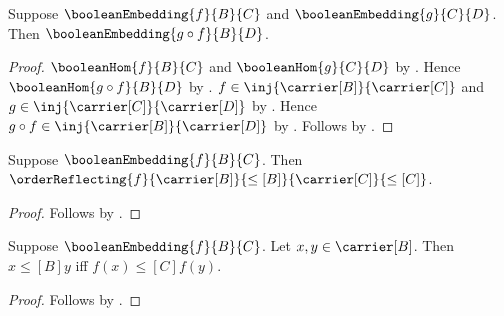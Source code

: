\begin{theorem}\label{boolean_embedding_composition}
    Suppose $\booleanEmbedding{f}{B}{C}$ and
        $\booleanEmbedding{g}{C}{D}$.
    Then $\booleanEmbedding{g\circ f}{B}{D}$.
\end{theorem}
\begin{proof}
    $\booleanHom{f}{B}{C}$ and $\booleanHom{g}{C}{D}$ by
        .
    Hence $\booleanHom{g\circ f}{B}{D}$ by
        .
    $f\in\inj{\carrier[B]}{\carrier[C]}$ and
        $g\in\inj{\carrier[C]}{\carrier[D]}$ by
        .
    Hence $g\circ f\in\inj{\carrier[B]}{\carrier[D]}$ by
        .
    Follows by .
\end{proof}

\begin{theorem}\label{boolean_embedding_order_reflecting}
    Suppose $\booleanEmbedding{f}{B}{C}$.
    Then
        $\orderReflecting
            {f}{\carrier[B]}{\leq[B]}
            {\carrier[C]}{\leq[C]}$.
\end{theorem}
\begin{proof}
    Follows by
        .
\end{proof}

\begin{proposition}\label{boolean_embedding_order_iff}
    Suppose $\booleanEmbedding{f}{B}{C}$.
    Let $x,y\in\carrier[B]$.
    Then $x\mathrel{\leq[B]}y$ iff
        $f(x)\mathrel{\leq[C]}f(y)$.
\end{proposition}
\begin{proof}
    Follows by
        .
\end{proof}
